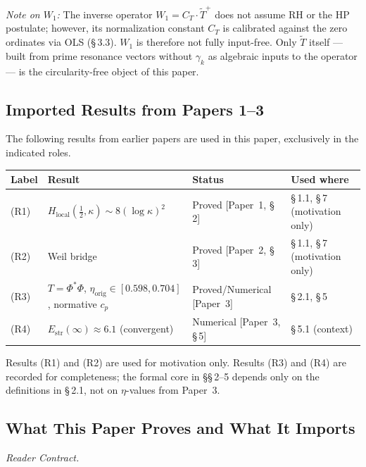 \documentclass[11pt]{article}
\newcommand{\Estr}{E_{\mathrm{str}}}
\newcommand{\etaorig}{\eta_{\mathrm{orig}}}
\newcommand{\Tt}{\widetilde{T}}
\newcommand{\CT}{C_{T}}
\newcommand{\Wone}{W_1}
\begin{document}
\emph{Note on $\Wone$:}
The inverse operator $\Wone = \CT\cdot\Tt^+$ does not assume RH or the
HP postulate; however, its normalization constant $\CT$ is calibrated
against the zero ordinates via OLS (\S\,3.3).
$\Wone$ is therefore not fully input-free.
Only $\Tt$ itself --- built from prime resonance vectors without $\gamma_k$
as algebraic inputs to the operator --- is the circularity-free object
of this paper.

\subsection{Imported Results from Papers 1--3}

The following results from earlier papers are used in this paper,
exclusively in the indicated roles.

\begin{center}
\small
\renewcommand{\arraystretch}{1.3}
\begin{tabular}{lp{4.5cm}p{2.8cm}p{3cm}}
\toprule
Label & Result & Status & Used where \\
\midrule
(R1) & $H_{\mathrm{local}}(\tfrac{1}{2},\kappa)\sim 8(\log\kappa)^2$
  & Proved [Paper~1, \S\,2] & \S\,1.1, \S\,7 (motivation only) \\
(R2) & Weil bridge
  & Proved [Paper~2, \S\,3] & \S\,1.1, \S\,7 (motivation only) \\
(R3) & $T=\Phi^*\Phi$, $\etaorig\in[0.598,0.704]$, normative $c_p$
  & Proved/Numerical [Paper~3] & \S\,2.1, \S\,5 \\
(R4) & $\Estr(\infty)\approx 6.1$ (convergent)
  & Numerical [Paper~3, \S\,5] & \S\,5.1 (context) \\
\bottomrule
\end{tabular}
\end{center}

Results (R1) and (R2) are used for motivation only.
Results (R3) and (R4) are recorded for completeness;
the formal core in \S\S\,2--5 depends only on the definitions in \S\,2.1,
not on $\eta$-values from Paper~3.

\subsection{What This Paper Proves and What It Imports}

\emph{Reader Contract.}
\end{document}
